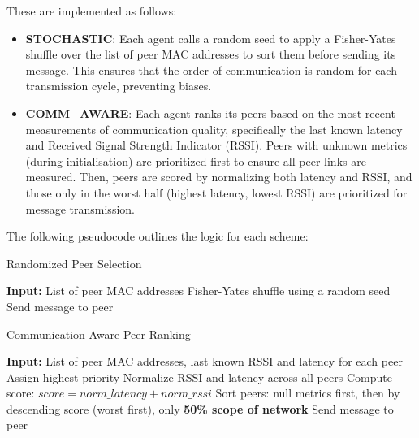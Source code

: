 \documentclass[conference]{IEEEtran}
\begin{document}
These are implemented as follows:

\begin{itemize}
    \item \textbf{STOCHASTIC}: Each agent calls a random seed to apply a Fisher-Yates shuffle over the list of peer MAC addresses to sort them before sending its message. This ensures that the order of communication is random for each transmission cycle, preventing biases.
    \item \textbf{COMM\_AWARE}: Each agent ranks its peers based on the most recent measurements of communication quality, specifically the last known latency and Received Signal Strength Indicator (RSSI). Peers with unknown metrics (during initialisation) are prioritized first to ensure all peer links are measured. Then, peers are scored by normalizing both latency and RSSI, and those only in the worst half (highest latency, lowest RSSI) are prioritized for message transmission.
\end{itemize}

The following pseudocode outlines the logic for each scheme:

\begin{algorithm}[H]
\caption{Randomized Peer Selection}
\begin{algorithmic}[1]
\State \textbf{Input:} List of peer MAC addresses
\State Fisher-Yates shuffle using a random seed
        \State Send message to peer
    \EndIf
\EndFor
\end{algorithmic}
\end{algorithm}

\begin{algorithm}[H]
\caption{Communication-Aware Peer Ranking}
\begin{algorithmic}[1]
\State \textbf{Input:} List of peer MAC addresses, last known RSSI and latency for each peer
        \State Assign highest priority
    \Else
        \State Normalize RSSI and latency across all peers
        \State Compute score: $score = norm\_latency + norm\_rssi$
    \EndIf
\EndFor
\State Sort peers: null metrics first, then by descending score (worst first), only \textbf{50\% scope of network}
        \State Send message to peer
    \EndIf
\EndFor
\end{algorithmic}
\end{algorithm}
\end{document}
